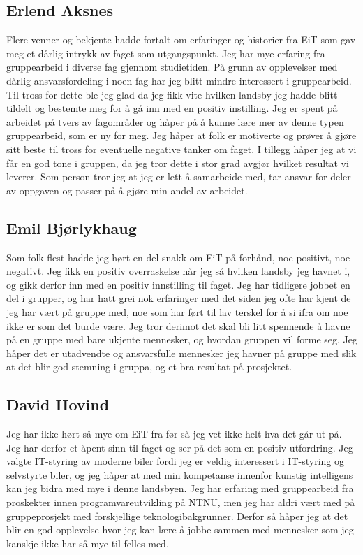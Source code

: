\subsection*{Erlend Aksnes} Flere venner og bekjente hadde fortalt om erfaringer og historier fra EiT som gav meg et dårlig intrykk av faget som utgangspunkt. 
Jeg har mye erfaring fra gruppearbeid i diverse fag gjennom studietiden.
 På grunn av opplevelser med dårlig ansvarsfordeling i noen fag har jeg blitt mindre interessert i gruppearbeid. 
Til tross for dette ble jeg glad da jeg fikk vite hvilken landsby jeg hadde blitt tildelt og bestemte meg for å gå inn med en positiv instilling.
Jeg er spent på arbeidet på tvers av fagområder og håper på å kunne lære mer av denne typen gruppearbeid, som er ny for meg.  
Jeg håper at folk er motiverte og prøver å gjøre sitt beste til tross for eventuelle negative tanker om faget. 
I tillegg håper jeg at vi får en god tone i gruppen, da jeg tror dette i stor grad avgjør hvilket resultat vi leverer. 
Som person tror jeg at jeg er lett å samarbeide med, tar ansvar for deler av oppgaven og passer på å gjøre min andel av arbeidet. 

\subsection*{Emil Bjørlykhaug}
Som folk flest hadde jeg hørt en del snakk om EiT på forhånd, noe positivt, noe negativt. 
Jeg fikk en positiv overraskelse når jeg så hvilken landsby jeg havnet i, og gikk derfor 
inn med en positiv innstilling til faget. Jeg har tidligere jobbet en del i grupper, og har 
hatt grei nok erfaringer med det siden jeg ofte har kjent de jeg har vært på gruppe med, 
noe som har ført til lav terskel for å si ifra om noe ikke er som det burde være. 
Jeg tror derimot det skal bli litt spennende å havne på en gruppe med bare ukjente mennesker, 
og hvordan gruppen vil forme seg. Jeg håper det er utadvendte og ansvarsfulle mennesker jeg 
havner på gruppe med slik at det blir god stemning i gruppa, og et bra resultat på prosjektet.

\subsection*{David Hovind} Jeg har ikke hørt så mye om EiT fra før så jeg vet ikke helt hva det går ut på. 
Jeg har derfor et åpent sinn til faget og ser på det som en positiv utfordring. Jeg valgte IT-styring av moderne
biler fordi jeg er veldig interessert i IT-styring og selvstyrte biler, og jeg håper at med min kompetanse innenfor 
kunstig intelligens kan jeg bidra med mye i denne landsbyen. Jeg har erfaring med gruppearbeid fra proskekter 
innen programvareutvikling på NTNU, men jeg har aldri vært med på gruppeprosjekt med forskjellige teknologibakgrunner.
Derfor så håper jeg at det blir en god opplevelse hvor jeg kan lære å jobbe sammen med mennesker som jeg kanskje ikke
har så mye til felles med.

